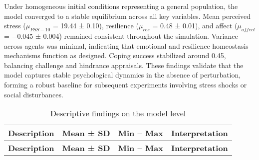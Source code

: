 \documentclass[
  letterpaper,
  DIV=11,
  numbers=noendperiod]{scrartcl}
\begin{document}
Under homogeneous initial conditions representing a general population,
the model converged to a stable equilibrium across all key variables.
Mean perceived stress (\(\mu_{PSS-10}\) = 19.44 ± 0.10), resilience
(\(\mu_{res}\) = 0.48 ± 0.01), and affect (\(\mu_{affect}\) = −0.045 ±
0.004) remained consistent throughout the simulation. Variance across
agents was minimal, indicating that emotional and resilience homeostasis
mechanisms function as designed. Coping success stabilized around 0.45,
balancing challenge and hindrance appraisals. These findings validate
that the model captures stable psychological dynamics in the absence of
perturbation, forming a robust baseline for subsequent experiments
involving stress shocks or social disturbances.

\begin{longtable}[]{@{}
  >{\raggedright\arraybackslash}p{}
  >{\raggedright\arraybackslash}p{}
  >{\raggedright\arraybackslash}p{}
  >{\raggedright\arraybackslash}p{}@{}}
\caption{Descriptive findings on the model level}\tabularnewline
\toprule\noalign{}
\begin{minipage}[b]{\linewidth}\raggedright
\textbf{Description}
\end{minipage} & \begin{minipage}[b]{\linewidth}\raggedright
\textbf{Mean ± SD}
\end{minipage} & \begin{minipage}[b]{\linewidth}\raggedright
\textbf{Min -- Max}
\end{minipage} & \begin{minipage}[b]{\linewidth}\raggedright
\textbf{Interpretation}
\end{minipage} \\
\midrule\noalign{}
\endfirsthead
\toprule\noalign{}
\begin{minipage}[b]{\linewidth}\raggedright
\textbf{Description}
\end{minipage} & \begin{minipage}[b]{\linewidth}\raggedright
\textbf{Mean ± SD}
\end{minipage} & \begin{minipage}[b]{\linewidth}\raggedright
\textbf{Min -- Max}
\end{minipage} & \begin{minipage}[b]{\linewidth}\raggedright
\textbf{Interpretation}
\end{minipage} \\

\end{longtable}
\end{document}
